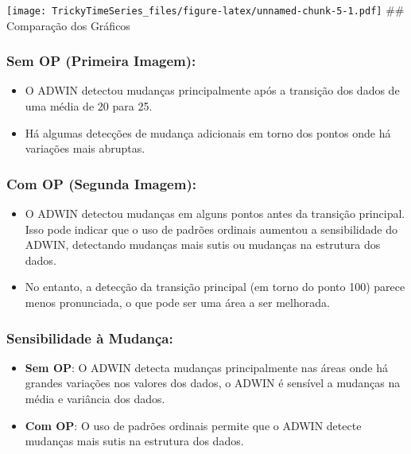 \documentclass[
]{article}
\providecommand{\tightlist}{%
  \setlength{\itemsep}{0pt}\setlength{\parskip}{0pt}}
\begin{document}
\texttt{[image: TrickyTimeSeries\_files/figure-latex/unnamed-chunk-5-1.pdf]}
\#\# Comparação dos Gráficos

\hypertarget{sem-op-primeira-imagem}{%
\subsubsection{Sem OP (Primeira Imagem):}\label{sem-op-primeira-imagem}}

\begin{itemize}
\tightlist
\item
  O ADWIN detectou mudanças principalmente após a transição dos dados de
  uma média de 20 para 25.
\item
  Há algumas detecções de mudança adicionais em torno dos pontos onde há
  variações mais abruptas.
\end{itemize}

\hypertarget{com-op-segunda-imagem}{%
\subsubsection{Com OP (Segunda Imagem):}\label{com-op-segunda-imagem}}

\begin{itemize}
\item
  O ADWIN detectou mudanças em alguns pontos antes da transição
  principal. Isso pode indicar que o uso de padrões ordinais aumentou a
  sensibilidade do ADWIN, detectando mudanças mais sutis ou mudanças na
  estrutura dos dados.
\item
  No entanto, a detecção da transição principal (em torno do ponto 100)
  parece menos pronunciada, o que pode ser uma área a ser melhorada.
\end{itemize}

\hypertarget{sensibilidade-uxe0-mudanuxe7a}{%
\subsubsection{Sensibilidade à
Mudança:}\label{sensibilidade-uxe0-mudanuxe7a}}

\begin{itemize}
\item
  \textbf{Sem OP}: O ADWIN detecta mudanças principalmente nas áreas
  onde há grandes variações nos valores dos dados, o ADWIN é sensível a
  mudanças na média e variância dos dados.
\item
  \textbf{Com OP}: O uso de padrões ordinais permite que o ADWIN detecte
  mudanças mais sutis na estrutura dos dados.
\end{itemize}
\end{document}
